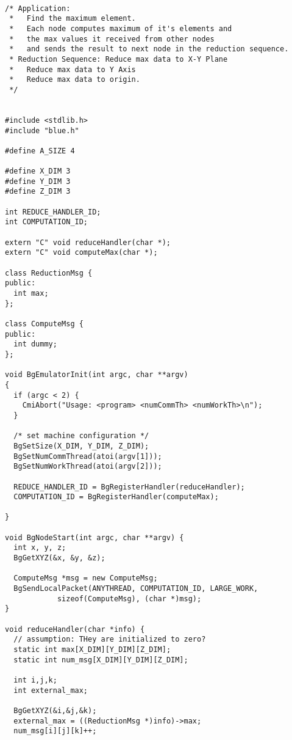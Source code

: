 \begin{verbatim}

/* Application: 
 *   Find the maximum element.
 *   Each node computes maximum of it's elements and
 *   the max values it received from other nodes
 *   and sends the result to next node in the reduction sequence.
 * Reduction Sequence: Reduce max data to X-Y Plane
 *   Reduce max data to Y Axis
 *   Reduce max data to origin.
 */


#include <stdlib.h>
#include "blue.h"

#define A_SIZE 4

#define X_DIM 3
#define Y_DIM 3
#define Z_DIM 3

int REDUCE_HANDLER_ID;
int COMPUTATION_ID;

extern "C" void reduceHandler(char *);
extern "C" void computeMax(char *);

class ReductionMsg {
public:
  int max;
};

class ComputeMsg {
public:
  int dummy;
};

void BgEmulatorInit(int argc, char **argv)
{
  if (argc < 2) { 
    CmiAbort("Usage: <program> <numCommTh> <numWorkTh>\n"); 
  }

  /* set machine configuration */
  BgSetSize(X_DIM, Y_DIM, Z_DIM);
  BgSetNumCommThread(atoi(argv[1]));
  BgSetNumWorkThread(atoi(argv[2]));

  REDUCE_HANDLER_ID = BgRegisterHandler(reduceHandler);
  COMPUTATION_ID = BgRegisterHandler(computeMax);

}

void BgNodeStart(int argc, char **argv) {
  int x, y, z;
  BgGetXYZ(&x, &y, &z);

  ComputeMsg *msg = new ComputeMsg;
  BgSendLocalPacket(ANYTHREAD, COMPUTATION_ID, LARGE_WORK, 
			sizeof(ComputeMsg), (char *)msg);
}

void reduceHandler(char *info) {
  // assumption: THey are initialized to zero?
  static int max[X_DIM][Y_DIM][Z_DIM];
  static int num_msg[X_DIM][Y_DIM][Z_DIM];

  int i,j,k;
  int external_max;

  BgGetXYZ(&i,&j,&k);
  external_max = ((ReductionMsg *)info)->max;
  num_msg[i][j][k]++;


\end{verbatim}
